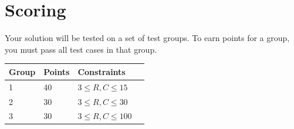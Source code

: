 \section*{Scoring}
Your solution will be tested on a set of test groups. To earn points for a group,
you must pass all test cases in that group.

\begin{tabular}{| l | l | l | l |}
\hline
Group & Points & Constraints \\ \hline
1 & 40 & $3 \le R,C \le 15$ \\ \hline
2 & 30 & $3 \le R,C \le 30$ \\ \hline
3 & 30 & $3 \le R,C \le 100$ \\ \hline
\end{tabular}
